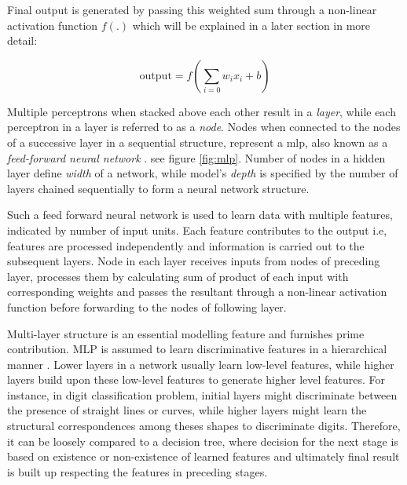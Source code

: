 Final output is generated by passing this weighted sum through a non-linear activation function $f(.)$ which will be explained in a later section in more detail:

\begin{equation}{\mathrm{output}}= f\left(\sum_{i=0} w_{i} x_{i}+b\right)\end{equation}


Multiple perceptrons when stacked above each other result in a \textit{layer}, while each perceptron in a layer is referred to as a \textit{node}. Nodes when connected to the nodes of a successive layer in a sequential structure, represent a \gls{mlp}, also known as a \textit{feed-forward neural network} \cite{Svozil1997}. see figure \ref{fig:mlp}.
Number of nodes in a hidden layer define \textit{width} of a network, while model's \textit{depth} is specified by the number of layers chained sequentially to form a neural network structure.

Such a feed forward neural network is used to learn data with multiple features, indicated by  number of input units. Each feature contributes to the output i.e, features are processed independently and information is carried out to the subsequent layers. Node in each layer receives inputs from nodes of preceding layer, processes them by calculating sum of product of each input with corresponding weights and passes the resultant through a non-linear activation function before forwarding to the nodes of following layer. 

Multi-layer structure is an essential modelling feature and furnishes prime contribution. MLP is assumed to learn discriminative features in a hierarchical manner \cite{Goodfellow-et-al-2016}. Lower layers in a network usually learn low-level features, while higher layers build upon these low-level features to generate higher level features. For instance, in digit classification problem, initial layers might discriminate between the presence of straight lines or curves, while higher layers might learn the structural correspondences among theses shapes to discriminate digits. Therefore, it can be loosely compared to a decision tree, where decision for the next stage is based on existence or non-existence of learned features and ultimately final result is built up respecting the features in preceding stages.

